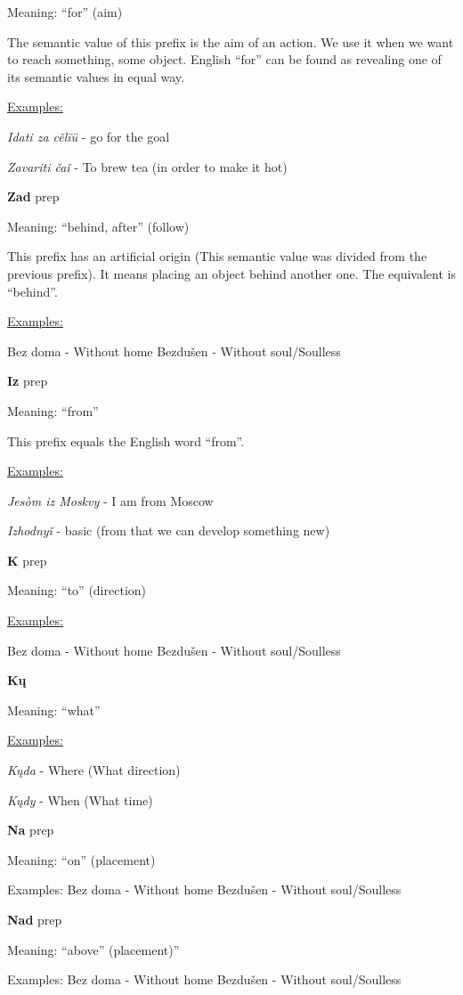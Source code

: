 Meaning: “for” (aim)

The semantic value of this prefix is the aim of an action. We use it when we want to reach something, some object. English “for” can be found as revealing one of its semantic values in equal way. 

\underline{Examples:}

\textit{Idati za cělïü} - go for the goal

\textit{Zavariti čaǐ }- To brew tea (in order to make it hot)


\textbf{Zad} \gls{prep}

Meaning: “behind, after” (follow)

This prefix has an artificial origin (This semantic value was divided from the previous prefix). It means placing an object behind another one. The equivalent is “behind”.

\underline{Examples:}

Bez doma - Without home
Bezdušen - Without soul/Soulless 

\textbf{Iz} \gls{prep}

Meaning: “from”

This prefix equals the English word “from”. 

\underline{Examples:}

\textit{Jesòm iz Moskvy} - I am from Moscow

\textit{Izhodnyǐ} - basic (from that we can develop something new)

\textbf{K} \gls{prep}

Meaning: “to” (direction)

\underline{Examples:}

Bez doma - Without home
Bezdušen - Without soul/Soulless 

\textbf{Kų}

Meaning: “what”

\underline{Examples:}

\textit{Kųda} - Where (What direction)

\textit{Kųdy} - When (What time) 

\textbf{Na} \gls{prep}

Meaning: “on” (placement)

Examples:
Bez doma - Without home
Bezdušen - Without soul/Soulless 

\textbf{Nad} \gls{prep}

Meaning: “above” (placement)”

Examples:
Bez doma - Without home
Bezdušen - Without soul/Soulless 

